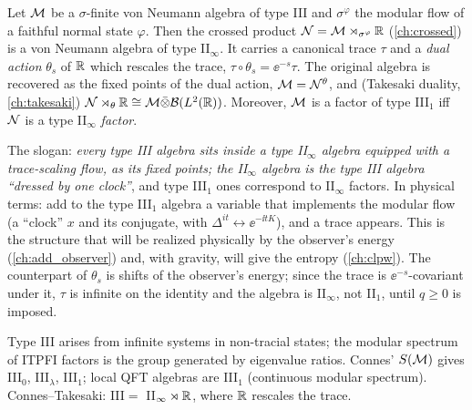\begin{theorem}
Let $\mathcal{M}$ be a $\sigma$-finite von Neumann algebra of type III and $\sigma^\varphi$ the modular flow of a faithful normal state $\varphi$. Then the crossed product $\mathcal{N}=\mathcal{M}\rtimes_{\sigma^\varphi}\mathbb{R}$ (\cref{ch:crossed}) is a von Neumann algebra of type II$_\infty$. It carries a canonical trace $\tau$ and a \emph{dual action} $\theta_s$ of $\mathbb{R}$ which rescales the trace, $\tau\circ\theta_s=\ee^{-s}\tau$. The original algebra is recovered as the fixed points of the dual action, $\mathcal{M}=\mathcal{N}^{\theta}$, and (Takesaki duality, \cref{ch:takesaki}) $\mathcal{N}\rtimes_\theta\mathbb{R}\cong\mathcal{M}\bar\otimes\mathcal{B}(L^2(\mathbb{R}))$. Moreover, $\mathcal{M}$ is a factor of type III$_1$ iff $\mathcal{N}$ is a type II$_\infty$ \emph{factor}.
\end{theorem}
The slogan: \emph{every type III algebra sits inside a type II$_\infty$ algebra equipped with a trace-scaling flow, as its fixed points; the II$_\infty$ algebra is the type III algebra ``dressed by one clock''}, and type III$_1$ ones correspond to II$_\infty$ factors. In physical terms: add to the type III$_1$ algebra a variable that implements the modular flow (a ``clock'' $x$ and its conjugate, with $\Delta^{it}\leftrightarrow\ee^{-\ii tK}$), and a trace appears. This is the structure that will be realized physically by the observer's energy (\cref{ch:add_observer}) and, with gravity, will give the entropy (\cref{ch:clpw}). The counterpart of $\theta_s$ is shifts of the observer's energy; since the trace is $\ee^{-s}$-covariant under it, $\tau$ is infinite on the identity and the algebra is II$_\infty$, not II$_1$, until $q\ge0$ is imposed.

\begin{keyidea}
Type III arises from infinite systems in non-tracial states; the modular spectrum of ITPFI factors is the group generated by eigenvalue ratios. Connes' $S(\mathcal{M})$ gives III$_0$, III$_\lambda$, III$_1$; local QFT algebras are III$_1$ (continuous modular spectrum). Connes--Takesaki: III$=$ II$_\infty\rtimes\mathbb{R}$, where $\mathbb{R}$ rescales the trace.
\end{keyidea}

